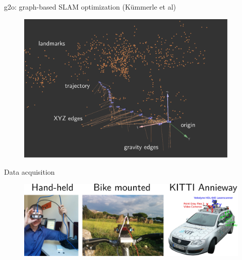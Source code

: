 \documentclass[11pt]{beamer}
\begin{document}
\begin{frame}{g2o: graph-based SLAM optimization (Kümmerle et al)}
\begin{figure}[!htb]
\centering
\includegraphics[width=0.95\textwidth]{figures/introduction/g2o_viewer.pdf}
\end{figure}
\end{frame}

\begin{frame}{Data acquisition}
\begin{figure}[!htb]
\centering
\includegraphics[width=\textwidth]{figures/results/data_acquisition.pdf}
\end{figure}
\end{frame}
\end{document}
